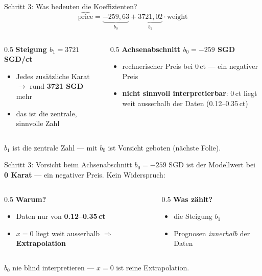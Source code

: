 \documentclass[aspectratio=169,11pt]{beamer}
\begin{document}
\begin{frame}{Schritt 3: Was bedeuten die Koeffizienten?}
\[
  \hat{\text{price}} = \underbrace{-259{,}63}_{b_0}
  + \underbrace{3721{,}02}_{b_1} \cdot \text{weight}
\]
\begin{columns}[T]
\begin{column}{0.5\textwidth}
\textbf{Steigung $b_1 = 3721$ SGD/ct}
\begin{itemize}
  \item Jedes zusätzliche Karat $\to$ rund \textbf{3721 SGD} mehr
  \item das ist die zentrale, sinnvolle Zahl
\end{itemize}
\end{column}
\begin{column}{0.5\textwidth}
\textbf{Achsenabschnitt $b_0 = -259$ SGD}
\begin{itemize}
  \item rechnerischer Preis bei 0\,ct --- ein \alert{negativer} Preis
  \item \textbf{nicht sinnvoll interpretierbar}: 0\,ct liegt weit
        ausserhalb der Daten (0.12--0.35\,ct)
\end{itemize}
\end{column}
\end{columns}
\vspace{0.3cm}
\centering
$b_1$ ist die zentrale Zahl --- mit $b_0$ ist Vorsicht geboten
(nächste Folie).
\end{frame}

\begin{frame}{Schritt 3: Vorsicht beim Achsenabschnitt}
$b_0 = -259$ SGD ist der Modellwert bei \textbf{0 Karat} --- ein
\alert{negativer Preis}. Kein Widerspruch:

\vspace{0.2cm}
\begin{columns}[T]
\begin{column}{0.5\textwidth}
\textbf{Warum?}
\begin{itemize}
  \item Daten nur von \textbf{0.12--0.35\,ct}
  \item $x = 0$ liegt weit ausserhalb $\Rightarrow$ \textbf{Extrapolation}
\end{itemize}
\end{column}
\begin{column}{0.5\textwidth}
\textbf{Was zählt?}
\begin{itemize}
  \item die \alert{Steigung} $b_1$
  \item Prognosen \emph{innerhalb} der Daten
\end{itemize}
\end{column}
\end{columns}
\vspace{0.2cm}
\begin{warnung}
$b_0$ nie blind interpretieren --- $x=0$ ist reine Extrapolation.
\end{warnung}
\end{frame}
\end{document}
